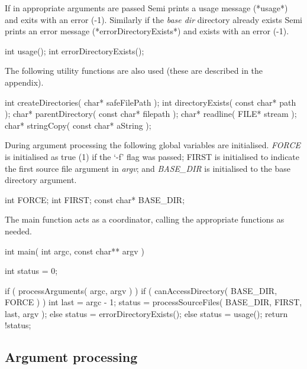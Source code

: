 \documentclass[]{article}
\begin{document}
If in appropriate arguments are passed Semi prints a usage message (*usage*) and exits with an error (-1).
Similarly if the \emph{base dir} directory already exists Semi prints an error message (*errorDirectoryExists*) and exists with an error (-1).

\begin{verbatimtab}
int                   usage();
int    errorDirectoryExists();

\end{verbatimtab}

The following utility functions are also used (these are described in the appendix).

\begin{verbatimtab}
int       createDirectories(       char* safeFilePath );
int         directoryExists( const char* path );
char*       parentDirectory( const char* filepath );
char*              readline( FILE* stream );
char*            stringCopy( const char* aString );

\end{verbatimtab}

During argument processing the following global variables are initialised.
\emph{FORCE} is initialised as true (1) if the `-f' flag was passed; FIRST is initialised to indicate the first source file argument in \emph{argv}; and \emph{BASE_DIR} is initialised to the base directory argument.

\begin{verbatimtab}
int         FORCE;
int         FIRST;
const char* BASE_DIR;

\end{verbatimtab}

The main function acts as a coordinator, calling the appropriate functions as needed.

\begin{verbatimtab}
int main( int argc, const char** argv )
{
	int status = 0;

	if ( processArguments( argc, argv ) )
	{
		if ( canAccessDirectory( BASE_DIR, FORCE ) )
		{
			int last = argc - 1;
			status = processSourceFiles( BASE_DIR, FIRST, last, argv );
		}
		else
		{
			status = errorDirectoryExists();
		}
	}
	else
	{
		status = usage();
	}
	return !status;
}

\end{verbatimtab}
\subsection{		Argument processing}
\end{document}
